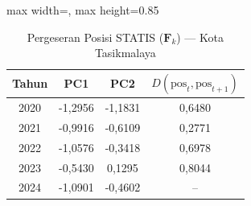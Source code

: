 \begin{table}[H]
\centering
\caption{Pergeseran Posisi STATIS ($\mathbf{F}_k$) --- Kota Tasikmalaya} \label{tab:app2jarak_statis_skor_kota_tasikmalaya}
\begin{adjustbox}{max width=\textwidth, max height=0.85\textheight}
\begin{tabular}{|c|c|c|c|}
\hline
\textbf{Tahun} & \textbf{PC1} & \textbf{PC2} & \textbf{$D(\text{pos}_t, \text{pos}_{t+1})$} \\
\hline
2020 & -1,2956 & -1,1831 & 0,6480 \\
2021 & -0,9916 & -0,6109 & 0,2771 \\
2022 & -1,0576 & -0,3418 & 0,6978 \\
2023 & -0,5430 & 0,1295 & 0,8044 \\
2024 & -1,0901 & -0,4602 & -- \\
\hline
\end{tabular}
\end{adjustbox}
\end{table}